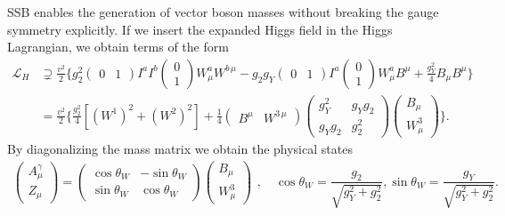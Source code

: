\acs{SSB} enables the generation of vector boson masses without breaking the gauge symmetry explicitly. If we insert the expanded Higgs field in the Higgs Lagrangian, we obtain terms of the form
\begin{equation}
\begin{split}
\mathcal{L}_H &\supsetneq \frac{v^2}{2} \bigg \lbrace g_2^2 \begin{pmatrix} 0 & 1 \end{pmatrix} I^a I^b \begin{pmatrix} 0 \\ 1 \end{pmatrix} W^a_\mu W^{b\, \mu} - g_2 g_Y \begin{pmatrix} 0 & 1 \end{pmatrix} I^a \begin{pmatrix} 0 \\ 1 \end{pmatrix} W_\mu^a B^\mu + \frac{g_Y^2}{4} B_\mu B^\mu \bigg \rbrace \\
&= \frac{v^2}{2} \bigg \lbrace \frac{g_2^2}{4} \left[ (W^1)^2 + (W^2)^2 \right] + \frac{1}{4} \begin{pmatrix} B^\mu & W^{3\, \mu} \end{pmatrix} \begin{pmatrix}  g_Y^2 & g_Y g_2 \\ g_Y g_2 & g_2^2 \end{pmatrix} \begin{pmatrix} B_\mu \\ W^3_\mu \end{pmatrix} \bigg \rbrace.
\end{split}
\end{equation}
By diagonalizing the mass matrix we obtain the physical states
\begin{equation}
\begin{gathered}
\begin{pmatrix}
A^\gamma_\mu \\
Z_\mu
\end{pmatrix} = \begin{pmatrix}
\cos \theta_W & - \sin \theta_W \\
\sin \theta_W & \cos \theta_W
\end{pmatrix} \begin{pmatrix}
B_\mu \\
W_\mu^3
\end{pmatrix}
\end{gathered}, \quad \cos \theta_W = \frac{g_2}{\sqrt{g_Y^2 + g_2^2}}, \sin \theta_W = \frac{g_Y}{\sqrt{g_Y^2 + g_2^2}}.
\end{equation}
